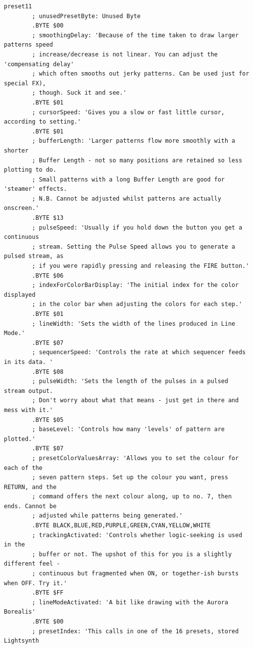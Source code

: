 \begin{lstlisting}[basicstyle=\ttfamily\tiny,caption=Source code for Preset 11.]
preset11
        ; unusedPresetByte: Unused Byte
        .BYTE $00
        ; smoothingDelay: 'Because of the time taken to draw larger patterns speed
        ; increase/decrease is not linear. You can adjust the 'compensating delay'
        ; which often smooths out jerky patterns. Can be used just for special FX),
        ; though. Suck it and see.'
        .BYTE $01
        ; cursorSpeed: 'Gives you a slow or fast little cursor, according to setting.'
        .BYTE $01
        ; bufferLength: 'Larger patterns flow more smoothly with a shorter
        ; Buffer Length - not so many positions are retained so less plotting to do.
        ; Small patterns with a long Buffer Length are good for 'steamer' effects.
        ; N.B. Cannot be adjusted whilst patterns are actually onscreen.'
        .BYTE $13
        ; pulseSpeed: 'Usually if you hold down the button you get a continuous
        ; stream. Setting the Pulse Speed allows you to generate a pulsed stream, as
        ; if you were rapidly pressing and releasing the FIRE button.'
        .BYTE $06
        ; indexForColorBarDisplay: 'The initial index for the color displayed
        ; in the color bar when adjusting the colors for each step.'
        .BYTE $01
        ; lineWidth: 'Sets the width of the lines produced in Line Mode.'
        .BYTE $07
        ; sequencerSpeed: 'Controls the rate at which sequencer feeds in its data. '
        .BYTE $08
        ; pulseWidth: 'Sets the length of the pulses in a pulsed stream output.
        ; Don't worry about what that means - just get in there and mess with it.'
        .BYTE $05
        ; baseLevel: 'Controls how many 'levels' of pattern are plotted.'
        .BYTE $07
        ; presetColorValuesArray: 'Allows you to set the colour for each of the
        ; seven pattern steps. Set up the colour you want, press RETURN, and the
        ; command offers the next colour along, up to no. 7, then ends. Cannot be
        ; adjusted while patterns being generated.'
        .BYTE BLACK,BLUE,RED,PURPLE,GREEN,CYAN,YELLOW,WHITE
        ; trackingActivated: 'Controls whether logic-seeking is used in the
        ; buffer or not. The upshot of this for you is a slightly different feel -
        ; continuous but fragmented when ON, or together-ish bursts when OFF. Try it.'
        .BYTE $FF
        ; lineModeActivated: 'A bit like drawing with the Aurora Borealis'
        .BYTE $00
        ; presetIndex: 'This calls in one of the 16 presets, stored Lightsynth

\end{lstlisting}
